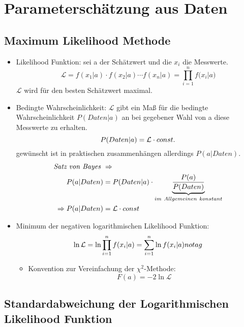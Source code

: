 \documentclass[10pt,a4paper]{article}
\begin{document}
\newpage
\section{Parameterschätzung aus Daten}

\subsection{Maximum Likelihood Methode}
\begin{itemize}
\item Likelihood Funktion:
sei a der Schätzwert und die $x_i$ die Messwerte.
\begin{equation}
\mathcal{L}= f(x_1|a)\cdot f(x_2|a)\cdots f(x_n|a)=\prod^{n}_{i=1}{f(x_i|a})
\end{equation}
$\mathcal{L}$ wird für den besten Schätzwert maximal.
\item Bedingte Wahrscheinlichkeit: \newline
$\mathcal{L}$ gibt ein Maß für die bedingte Wahrscheinlichkeit $P(Daten|a)$ an bei gegebener Wahl von a diese Messwerte zu erhalten.
\begin{equation}
P(Daten|a)=\mathcal{L}\cdot const. \notag
\end{equation}
gewünscht ist in praktischen zusammenhängen allerdings $P(a|Daten)$.
\begin{align}
\textit{Satz von Bayes } &\Rightarrow \notag \\
P(a|Daten)&=P(Daten|a)\cdot \underbrace{\frac{P(a)}{P(Daten)}}_{im~Allgemeinen~konstant} \notag \\
\Rightarrow P(a|Daten)&=\mathcal{L}\cdot const
\end{align}
\item Minimum der negativen logarithmischen Likelihood Funktion:
\begin{equation}
\ln{\mathcal{L}}=\ln{\prod^{n}_{i=1}{f(x_i|a})}=\sum^{n}_{i=1}{\ln{f(x_i|a)}} \\notag
\end{equation}
\begin{itemize}
\item Konvention zur Vereinfachung der $\chi^2$-Methode:
\begin{equation}
F(a)=-2\ln{\mathcal{L}}
\end{equation}
\end{itemize}
\end{itemize}

\subsection{Standardabweichung der Logarithmischen Likelihood Funktion}
\end{document}
